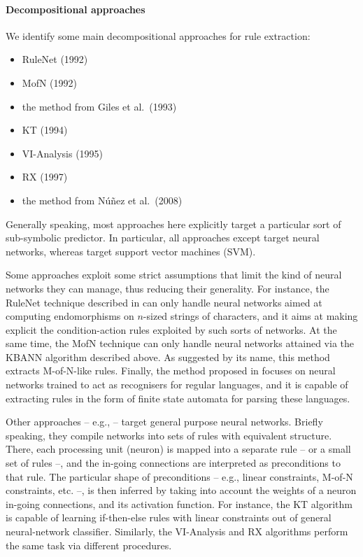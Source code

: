 \documentclass[12pt,a4paper,openright,twoside]{book}
\begin{document}
\paragraph{Decompositional approaches}

We identify some main decompositional approaches for rule extraction:
%
\begin{itemize}
	\item RuleNet (1992) \cite{mcmillan1992}
	\item MofN (1992) \cite{towell1992}
	\item the method from Giles et al.\ (1993) \cite{giles1993}
	\item KT (1994) \cite{fu1994}
	\item VI-Analysis (1995) \cite{thrun1995}
	\item RX (1997) \cite{Setiono1997}
	\item the method from N\'u\~{n}ez et al.\ (2008) \cite{NunezAC08}
\end{itemize}

Generally speaking, most approaches here explicitly target a particular sort of sub-symbolic predictor.
%
In particular, all approaches except \cite{NunezAC08} target neural networks, whereas \cite{NunezAC08} target support vector machines (SVM).

Some approaches \cite{mcmillan1992,towell1992,giles1993} exploit some strict assumptions that limit the kind of neural networks they can manage, thus reducing their generality.
%
For instance, the RuleNet technique described in \cite{mcmillan1992} can only handle neural networks aimed at computing endomorphisms on $n$-sized strings of characters, and it aims at making explicit the condition-action rules exploited by such sorts of networks.
%
At the same time, the MofN technique \cite{towell1992} can only handle neural networks attained via the KBANN algorithm described above.
%
As suggested by its name, this method extracts M-of-N-like rules.
%
Finally, the method proposed in \cite{giles1993} focuses on neural networks trained to act as recognisers for regular languages, and it is capable of extracting rules in the form of finite state automata for parsing these languages.

Other approaches -- e.g., \cite{fu1994,thrun1995,Setiono1997} -- target general purpose neural networks.
%
Briefly speaking, they compile networks into sets of rules with equivalent structure.
%
There, each processing unit (neuron) is mapped into a separate rule -- or a small set of rules --, and the in-going connections are interpreted as preconditions to that rule.
%
The particular shape of preconditions -- e.g., linear constraints, M-of-N constraints, etc. --, is then inferred by taking into account the weights of a neuron in-going connections, and its activation function.
%
For instance, the KT algorithm \cite{fu1994} is capable of learning if-then-else rules with linear constraints out of general neural-network classifier.
%
Similarly, the VI-Analysis \cite{thrun1995} and RX \cite{Setiono1997} algorithms perform the same task via different procedures.
\end{document}
